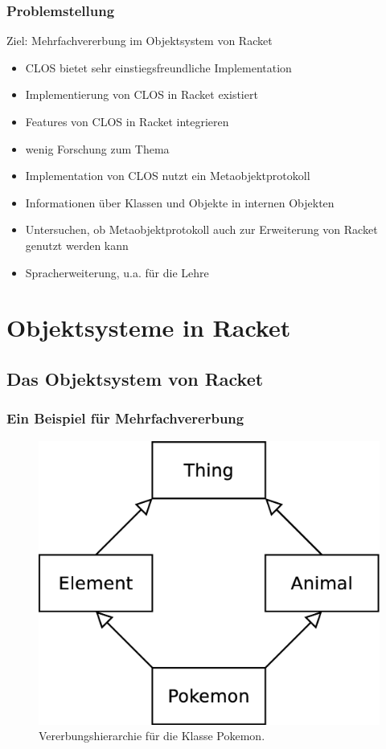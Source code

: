 \documentclass{beamer}
\begin{document}
\begin{frame}
 \frametitle{Problemstellung}
 Ziel: Mehrfachvererbung im Objektsystem von Racket
 \vspace{0.5cm}
 \begin{itemize}
  \item CLOS bietet sehr einstiegsfreundliche Implementation
  \item Implementierung von CLOS in Racket existiert
  \item[\textbf{\textrightarrow}] Features von CLOS in Racket integrieren
 \end{itemize}
 \vspace{0.2cm}
 \begin{itemize}
  \item wenig Forschung zum Thema 
  \item Implementation von CLOS nutzt ein Metaobjektprotokoll
  \item Informationen über Klassen und Objekte in internen Objekten
  \item[\textbf{\textrightarrow}] Untersuchen, ob Metaobjektprotokoll auch zur Erweiterung von Racket genutzt werden kann
  \item[\textbf{\textrightarrow}] Spracherweiterung, u.a. für die Lehre
 \end{itemize}
\end{frame}

\section{Objektsysteme in Racket}
\subsection{Das Objektsystem von Racket}

\begin{frame}
 \frametitle{Ein Beispiel für Mehrfachvererbung}
 \begin{figure}
 \centering
 \includegraphics[scale=0.27]{pictures/pokemon}
 \caption{Vererbungshierarchie für die Klasse Pokemon.}
 \end{figure}
\end{frame}
\end{document}

